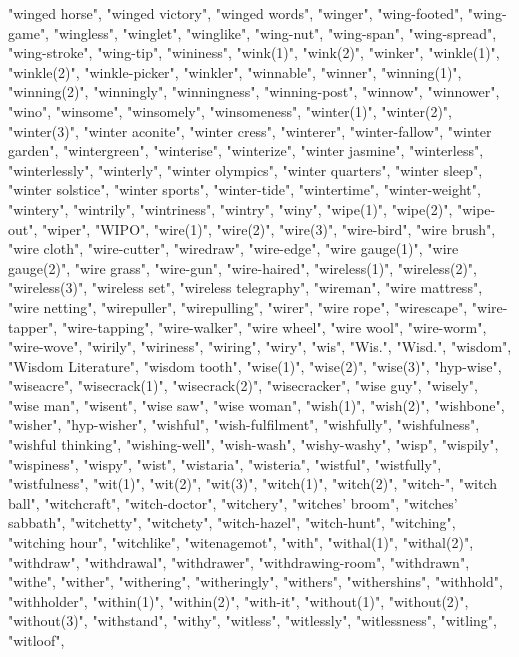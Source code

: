 "winged horse",
"winged victory",
"winged words",
"winger",
"wing-footed",
"wing-game",
"wingless",
"winglet",
"winglike",
"wing-nut",
"wing-span",
"wing-spread",
"wing-stroke",
"wing-tip",
"wininess",
"wink(1)",
"wink(2)",
"winker",
"winkle(1)",
"winkle(2)",
"winkle-picker",
"winkler",
"winnable",
"winner",
"winning(1)",
"winning(2)",
"winningly",
"winningness",
"winning-post",
"winnow",
"winnower",
"wino",
"winsome",
"winsomely",
"winsomeness",
"winter(1)",
"winter(2)",
"winter(3)",
"winter aconite",
"winter cress",
"winterer",
"winter-fallow",
"winter garden",
"wintergreen",
"winterise",
"winterize",
"winter jasmine",
"winterless",
"winterlessly",
"winterly",
"winter olympics",
"winter quarters",
"winter sleep",
"winter solstice",
"winter sports",
"winter-tide",
"wintertime",
"winter-weight",
"wintery",
"wintrily",
"wintriness",
"wintry",
"winy",
"wipe(1)",
"wipe(2)",
"wipe-out",
"wiper",
"WIPO",
"wire(1)",
"wire(2)",
"wire(3)",
"wire-bird",
"wire brush",
"wire cloth",
"wire-cutter",
"wiredraw",
"wire-edge",
"wire gauge(1)",
"wire gauge(2)",
"wire grass",
"wire-gun",
"wire-haired",
"wireless(1)",
"wireless(2)",
"wireless(3)",
"wireless set",
"wireless telegraphy",
"wireman",
"wire mattress",
"wire netting",
"wirepuller",
"wirepulling",
"wirer",
"wire rope",
"wirescape",
"wire-tapper",
"wire-tapping",
"wire-walker",
"wire wheel",
"wire wool",
"wire-worm",
"wire-wove",
"wirily",
"wiriness",
"wiring",
"wiry",
"wis",
"Wis.",
"Wisd.",
"wisdom",
"Wisdom Literature",
"wisdom tooth",
"wise(1)",
"wise(2)",
"wise(3)",
"hyp-wise",
"wiseacre",
"wisecrack(1)",
"wisecrack(2)",
"wisecracker",
"wise guy",
"wisely",
"wise man",
"wisent",
"wise saw",
"wise woman",
"wish(1)",
"wish(2)",
"wishbone",
"wisher",
"hyp-wisher",
"wishful",
"wish-fulfilment",
"wishfully",
"wishfulness",
"wishful thinking",
"wishing-well",
"wish-wash",
"wishy-washy",
"wisp",
"wispily",
"wispiness",
"wispy",
"wist",
"wistaria",
"wisteria",
"wistful",
"wistfully",
"wistfulness",
"wit(1)",
"wit(2)",
"wit(3)",
"witch(1)",
"witch(2)",
"witch-",
"witch ball",
"witchcraft",
"witch-doctor",
"witchery",
"witches' broom",
"witches' sabbath",
"witchetty",
"witchety",
"witch-hazel",
"witch-hunt",
"witching",
"witching hour",
"witchlike",
"witenagemot",
"with",
"withal(1)",
"withal(2)",
"withdraw",
"withdrawal",
"withdrawer",
"withdrawing-room",
"withdrawn",
"withe",
"wither",
"withering",
"witheringly",
"withers",
"withershins",
"withhold",
"withholder",
"within(1)",
"within(2)",
"with-it",
"without(1)",
"without(2)",
"without(3)",
"withstand",
"withy",
"witless",
"witlessly",
"witlessness",
"witling",
"witloof",
